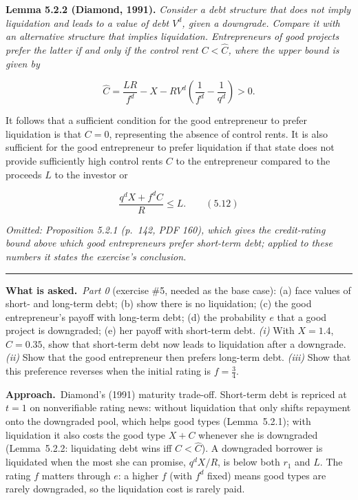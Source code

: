 \documentclass[11pt,a4paper]{article}
\newcommand{\asked}{\par\medskip\noindent\textbf{What is asked.}~}
\newcommand{\approach}{\par\smallskip\noindent\textbf{Approach.}~}
\newcommand{\stmtend}{\par\endgroup\nopagebreak\noindent\rule{\linewidth}{0.4pt}\par\medskip}
\begin{document}
\textbf{Lemma 5.2.2 (Diamond, 1991).} \emph{Consider a debt structure that does not imply
liquidation and leads to a value of debt \(V^d\), given a downgrade. Compare it with an alternative
structure that implies liquidation. Entrepreneurs of good projects prefer the latter if and only if
the control rent \(C < \widehat C\), where the upper bound is given by}

\[\widehat C = \frac{LR}{f^d} - X - RV^d\left(\frac{1}{f^d} - \frac{1}{q^d}\right) > 0.\]

It follows that a sufficient condition for the good entrepreneur to prefer liquidation is that
\(C = 0\), representing the absence of control rents. It is also sufficient for the good
entrepreneur to prefer liquidation if that state does not provide sufficiently high control rents
\(C\) to the entrepreneur compared to the proceeds \(L\) to the investor or

\[\frac{q^d X + f^d C}{R} \le L. \qquad (5.12)\]

\emph{Omitted: Proposition 5.2.1 (p.~142, PDF 160), which gives the credit-rating bound above which
good entrepreneurs prefer short-term debt; applied to these numbers it states the exercise's
conclusion.}
\stmtend

\asked \emph{Part 0} (exercise \#5, needed as the base case): (a) face values of short- and long-term
debt; (b) show there is no liquidation; (c) the good entrepreneur's payoff with long-term debt; (d) the
probability $e$ that a good project is downgraded; (e) her payoff with short-term debt.
\emph{(i)} With $X=1.4$, $C=0.35$, show that short-term debt now leads to liquidation after a downgrade.
\emph{(ii)} Show that the good entrepreneur then prefers long-term debt. \emph{(iii)} Show that this
preference reverses when the initial rating is $f=\tfrac34$.

\approach Diamond's (1991) maturity trade-off. Short-term debt is repriced at $t=1$ on nonverifiable
rating news: without liquidation that only shifts repayment onto the downgraded pool, which helps good
types (Lemma~5.2.1); with liquidation it also costs the good type $X+C$ whenever she is downgraded
(Lemma~5.2.2: liquidating debt wins iff $C<\widehat C$). A downgraded borrower is liquidated when the
most she can promise, $q^dX/R$, is below both $r_1$ and $L$. The rating $f$ matters through $e$: a higher
$f$ (with $f^d$ fixed) means good types are rarely downgraded, so the liquidation cost is rarely paid.
\end{document}
